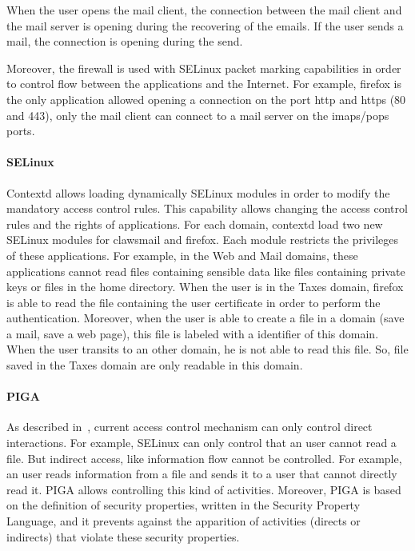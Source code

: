 \documentclass[conference]{IEEEtran}
\begin{document}
When the user opens the mail client, the connection between the mail client and the mail server is opening during the recovering of the emails. If the user sends a mail, the connection is opening during the send.

Moreover, the firewall is used with SELinux packet marking capabilities in order to control flow between the applications and the Internet.
For example, firefox is the only application allowed opening a connection on the port http and https (80 and 443), only the mail client can connect to a mail server on the imaps/pops ports.

\paragraph{SELinux}

Contextd allows loading dynamically SELinux modules in order to modify the mandatory access control rules.
This capability allows changing the access control rules and the rights of applications.
For each domain, contextd load two new SELinux modules for clawsmail and firefox.
Each module restricts the privileges of these applications.
For example, in the Web and Mail domains, these applications cannot read files containing sensible data like files containing private keys or files in the home directory.
When the user is in the Taxes domain, firefox is able to read the file containing the user certificate in order to perform the authentication.
Moreover, when the user is able to create a file in a domain (save a mail, save a web page), this file is labeled with a identifier of this domain. 
When the user transits to an other domain, he is not able to read this file.
So, file saved in the Taxes domain are only readable in this domain.

\paragraph{PIGA}

As described in~\cite{SHPCS09}, current access control mechanism can only control direct interactions.
For example, SELinux can only control that an user cannot read a file.
But indirect access, like information flow cannot be controlled.
For example, an user reads information from a file and sends it to a user that cannot directly read it.
PIGA allows controlling this kind of activities.
Moreover, PIGA is based on the definition of security properties, written in the Security Property Language, and it prevents against the apparition of activities (directs or indirects) that violate these security properties.
\end{document}
